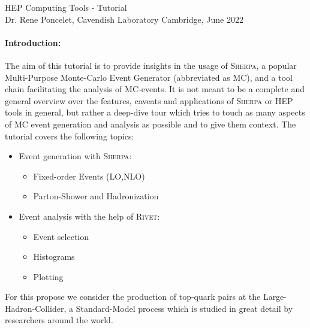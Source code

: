 \documentclass[a4paper,DIV12,fleqn]{scrartcl}
\begin{document}
\begin{center}
  {\Huge HEP Computing Tools - Tutorial}\\\vspace{1cm}
  Dr. Rene Poncelet, Cavendish Laboratory Cambridge, June 2022
\end{center}


\paragraph{Introduction:}
The aim of this tutorial is to provide insights in the usage of
\textsc{Sherpa}, a popular Multi-Purpose Monte-Carlo Event Generator
(abbreviated as MC), and a tool chain facilitating the analysis of
MC-events. It is not meant to be a complete and general overview over the
features, caveats and applications of \textsc{Sherpa} or HEP tools in general,
but rather a deep-dive tour which tries to touch as many aspects of
MC event generation and analysis as possible and to give them context.
The tutorial covers the following topics:

\begin{itemize}
  \item Event generation with \textsc{Sherpa}:
    \begin{itemize}
      \item Fixed-order Events (LO,NLO)
      \item Parton-Shower and Hadronization
    \end{itemize}
  \item Event analysis with the help of \textsc{Rivet}:
    \begin{itemize}
      \item Event selection
      \item Histograms
      \item Plotting
    \end{itemize}
\end{itemize}

For this propose we consider the production of top-quark pairs at the
Large-Hadron-Collider, a Standard-Model process which is studied in
great detail by researchers around the world.
\end{document}
